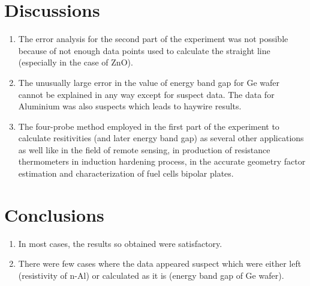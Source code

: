 \documentclass[%
 aip,
 amsmath,amssymb,
 reprint,%
]{revtex4-1}
\begin{document}
\section{Discussions}
\begin{enumerate}
    \item The error analysis for the second part of the experiment was not possible because of not enough data points used to calculate the straight line (especially in the case of ZnO).
    \item The unusually large error in the value of energy band gap for Ge wafer cannot be explained in any way except for suspect data. The data for Aluminium was also suspects which leads to haywire results.
    \item The four-probe method employed in the first part of the experiment to calculate resitivities (and later energy band gap) as several other applications as well like in the field of remote sensing, in production of resistance thermometers in induction hardening process, in the accurate geometry factor estimation and characterization of fuel cells bipolar plates.
\end{enumerate}

\section{Conclusions}
\begin{enumerate}
    \item In most cases, the results so obtained were satisfactory.
    \item There were few cases where the data appeared suspect which were either left (resistivity of n-Al) or calculated as it is (energy band gap of Ge wafer).
\end{enumerate}

\nocite{*}
\end{document}

